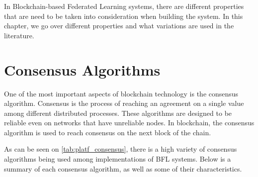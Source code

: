 In Blockchain-based Federated Learning systems, there are different properties that are need to be taken into consideration when building the system. In this chapter, we go over different properties and what variations are used in the literature.

\section{Consensus Algorithms}
\label{related_work:consensus_algorithms}

One of the most important aspects of blockchain technology is the consensus algorithm. Consensus is the process of reaching an agreement on a single value among different distributed processes. These algorithms are designed to be reliable even on networks that have unreliable nodes. In blockchain, the consensus algorithm is used to reach consensus on the next block of the chain.

As can be seen on \autoref{tab:platf_consensus}, there is a high variety of consensus algorithms being used among implementations of BFL systems. Below is a summary of each consensus algorithm, as well as some of their characteristics.


